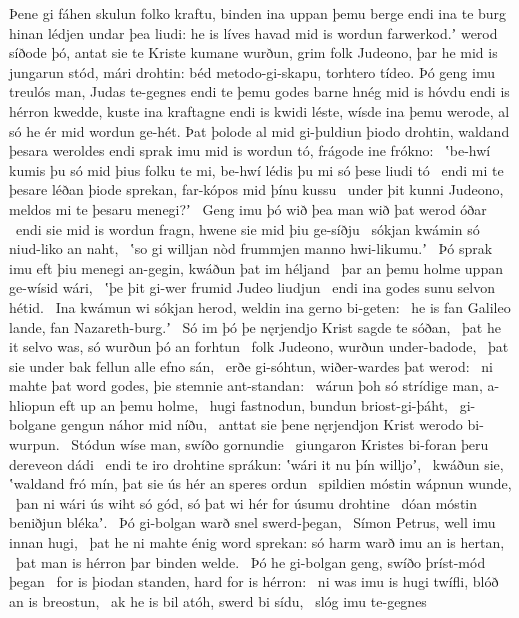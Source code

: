 Þene gi fáhen skulun folko kraftu,
binden ina uppan þemu berge endi ina te burg hinan
lédjen undar þea liudi: he is líves havad
mid is wordun farwerkod.ʼ werod síðode þó,
antat sie te Kriste kumane wurðun,
grim folk Judeono, þar he mid is jungarun stód,
mári drohtin: béd metodo-gi-skapu,
torhtero tídeo. Þó geng imu treulós man,
Judas te-gegnes endi te þemu godes barne
hnég mid is hóvdu endi is hérron kwedde,
kuste ina kraftagne endi is kwidi léste,
wísde ina þemu werode, al só he ér mid wordun ge-hét.
Þat þolode al mid gi-þuldiun þiodo drohtin,
waldand þesara weroldes endi sprak imu mid is wordun tó,
frágode ine frókno: \hld\ ʽbe-hwí kumis þu só mid þius folku te mi,
be-hwí lédis þu mi só þese liudi tó \hld\ endi mi te þesare léðan þiode sprekan,
far-kópos mid þínu kussu \hld\ under þit kunni Judeono,
meldos mi te þesaru menegi?ʼ \hld\ Geng imu þó wið þea man
wið þat werod óðar \hld\ endi sie mid is wordun fragn,
hwene sie mid þiu ge-síðju \hld\ sókjan kwámin
só niud-liko an naht, \hld\ ʽso gi willjan nòd frummjen
manno hwi-likumu.ʼ \hld\ Þó sprak imu eft þiu menegi an-gegin,
kwáðun þat im héljand \hld\ þar an þemu holme uppan
ge-wísid wári, \hld\ ʽþe þit gi-wer frumid
Judeo liudjun \hld\ endi ina godes sunu
selvon hétid. \hld\ Ina kwámun wi sókjan herod,
weldin ina gerno bi-geten: \hld\ he is fan Galileo lande,
fan Nazareth-burg.ʼ \hld\ Só im þó þe nęrjendjo Krist
sagde te sóðan, \hld\ þat he it selvo was,
só wurðun þó an forhtun \hld\ folk Judeono,
wurðun under-badode, \hld\ þat sie under bak fellun
alle efno sán, \hld\ erðe gi-sóhtun,
wiðer-wardes þat werod: \hld\ ni mahte þat word godes,
þie stemnie ant-standan: \hld\ wárun þoh só strídige man,
a-hliopun eft up an þemu holme, \hld\ hugi fastnodun,
bundun briost-gi-þáht, \hld\ gi-bolgane gengun
náhor mid níðu, \hld\ anttat sie þene nęrjendjon Krist
werodo bi-wurpun. \hld\ Stódun wíse man,
swíðo gornundie \hld\ giungaron Kristes
bi-foran þeru dereveon dádi \hld\ endi te iro drohtine sprákun:
ʽwári it nu þín willjoʼ, \hld\ kwáðun sie, ʽwaldand fró mín,
þat sie ús hér an speres ordun \hld\ spildien móstin
wápnun wunde, \hld\ þan ni wári ús wiht só gód,
só þat wi hér for úsumu drohtine \hld\ dóan móstin
beniðjun blékaʼ. \hld\ Þó gi-bolgan warð
snel swerd-þegan, \hld\ Símon Petrus,
well imu innan hugi, \hld\ þat he ni mahte énig word sprekan:
só harm warð imu an is hertan, \hld\ þat man is hérron þar
binden welde. \hld\ Þó he gi-bolgan geng,
swíðo þríst-mód þegan \hld\ for is þiodan standen,
hard for is hérron: \hld\ ni was imu is hugi twífli,
blóð an is breostun, \hld\ ak he is bil atóh,
swerd bi sídu, \hld\ slóg imu te-gegnes
